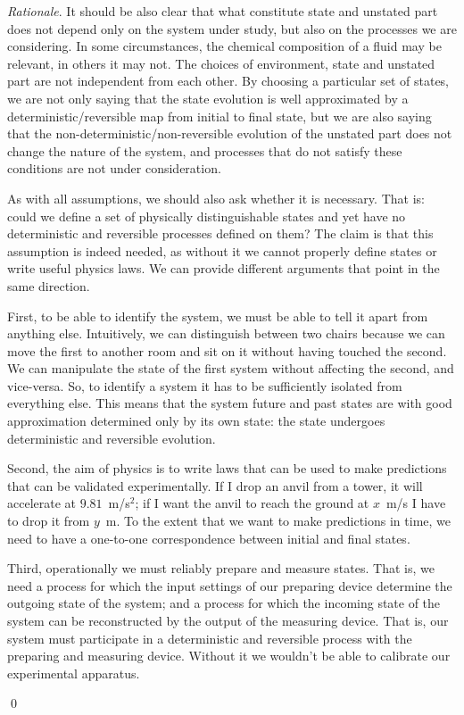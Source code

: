 \documentclass[aps,pra,10pt,twocolumn,floatfix,nofootinbib]{revtex4-1}
\theoremstyle{definition}
\newenvironment{rationale}{\emph{Rationale}.}{\qed}
\begin{document}
\begin{rationale}
It should be also clear that what constitute state and unstated part does not depend only on the system under study, but also on the processes we are considering. In some circumstances, the chemical composition of a fluid may be relevant, in others it may not. The choices of environment, state and unstated part are not independent from each other. By choosing a particular set of states, we are not only saying that the state evolution is well approximated by a deterministic/reversible map from initial to final state, but we are also saying that the non-deterministic/non-reversible evolution of the unstated part does not change the nature of the system, and processes that do not satisfy these conditions are not under consideration.

As with all assumptions, we should also ask whether it is necessary. That is: could we define a set of physically distinguishable states and yet have no deterministic and reversible processes defined on them? The claim is that this assumption is indeed needed, as without it we cannot properly define states or write useful physics laws. We can provide different arguments that point in the same direction.

First, to be able to identify the system, we must be able to tell it apart from anything else. Intuitively, we can distinguish between two chairs because we can move the first to another room and sit on it without having touched the second. We can manipulate the state of the first system without affecting the second, and vice-versa. So, to identify a system it has to be sufficiently isolated from everything else. This means that the system future and past states are with good approximation determined only by its own state: the state undergoes deterministic and reversible evolution.

Second, the aim of physics is to write laws that can be used to make predictions that can be validated experimentally. If I drop an anvil from a tower, it will accelerate at $9.81$~m/s$^2$; if I want the anvil to reach the ground at $x$~m/s I have to drop it from $y$~m. To the extent that we want to make predictions in time, we need to have a one-to-one correspondence between initial and final states.

Third, operationally we must reliably prepare and measure states. That is, we need a process for which the input settings of our preparing device determine the outgoing state of the system; and a process for which the incoming state of the system can be reconstructed by the output of the measuring device. That is, our system must participate in a deterministic and reversible process with the preparing and measuring device. Without it we wouldn't be able to calibrate our experimental apparatus.


\end{rationale}
\end{document}
